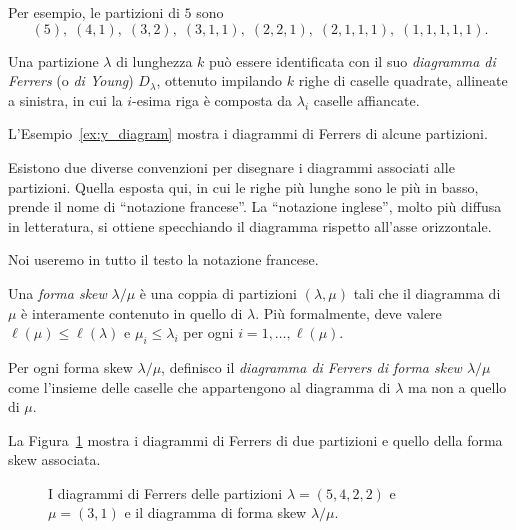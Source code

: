 \begin{example}
    Per esempio, le partizioni di $5$ sono
    \[
        (5)         ,\;
        (4,1)       ,\;
        (3,2)       ,\;
        (3,1,1)     ,\;
        (2,2,1)     ,\;
        (2,1,1,1)   ,\;
        (1,1,1,1,1).
    \]
\end{example}

\begin{definition}
    Una partizione $\lambda$ di lunghezza $k$ pu\`o essere identificata con il suo
    \emph{diagramma di Ferrers} (o \emph{di Young}) $D_\lambda$, ottenuto impilando
    $k$ righe di caselle quadrate, allineate a sinistra, in cui la $i$-esima
    riga \`e composta da $\lambda_i$ caselle affiancate.
\end{definition}

L'Esempio~\ref{ex:y_diagram} mostra i diagrammi di Ferrers di alcune partizioni.


\begin{remark}
    Esistono due diverse convenzioni per disegnare i diagrammi associati alle partizioni.
    Quella esposta qui, in cui le righe pi\`u lunghe sono le pi\`u in basso,
    prende il nome di ``notazione francese''.
    La ``notazione inglese'', molto pi\`u diffusa in letteratura, si ottiene specchiando
    il diagramma rispetto all'asse orizzontale.

    Noi useremo in tutto il testo la notazione francese.
\end{remark}

\begin{definition}
    Una \emph{forma skew} $\lambda/\mu$ \`e una coppia di partizioni $(\lambda, \mu)$
    tali che il diagramma di $\mu$ \`e interamente contenuto in
    quello di $\lambda$.
    Pi\`u formalmente, deve valere $\ell(\mu) \leq \ell(\lambda)$ e 
    $\mu_i \leq \lambda_i$ per ogni $i = 1, \dots, \ell(\mu)$.

    Per ogni forma skew $\lambda/\mu$, definisco il 
    \emph{diagramma di Ferrers di forma skew $\lambda/\mu$} come l'insieme delle caselle
    che appartengono al diagramma di $\lambda$ ma non a quello di $\mu$.
\end{definition}


\begin{example}
    \label{ex:y_diagram}
    La Figura~\ref{fig:ex_y_diagram} mostra i diagrammi di Ferrers
    di due partizioni e quello della forma skew associata.

\begin{figure}[htbp]
    \centering
    \qquad
    \qquad
    \ytableaushort{
        {}{},
        {}{},
        {\none}{}{}{},
        {\none}{\none}{\none}{}{}
    }
    \caption{I diagrammi di Ferrers delle partizioni $\lambda=(5,4,2,2)$ e
    $\mu=(3,1)$ e il diagramma di forma skew $\lambda/\mu$.}
    \label{fig:ex_y_diagram}
\end{figure}
\end{example}

